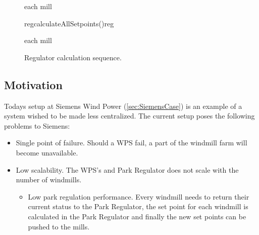 \begin{figure}
	\centering
	\begin{sequencediagram} %
	
		\begin{sdblock}{each mill}{}
		\end{sdblock}
		
		\begin{call}{reg}{calculateAllSetpoints()}{reg}{}
		\end{call}
	
		\begin{sdblock}{each mill}{}
		\end{sdblock}
					
	\end{sequencediagram}

	\caption[Regulator calculation sequence]{
		\label{fig:dataComputationSequence} 
		\footnotesize{%
			Regulator calculation sequence.
		}
	}
\end{figure}

\subsection{Motivation}

Todays setup at Siemens Wind Power (\cref{sec:SiemensCase}) is an example of a system wished to be made less centralized. The current setup poses the following problems to Siemens:  

\begin{itemize} 
	\item Single point of failure. Should a WPS fail, a part of the windmill farm will become unavailable.
	\item Low scalability. The WPS's and Park Regulator does not scale with the number of windmills.
	\begin{itemize}
		\item Low park regulation performance. Every windmill needs to return their current status to the Park Regulator, the set point for each windmill is calculated in the Park Regulator and finally the new set points can be pushed to the mills.
	\end{itemize}
\end{itemize}

